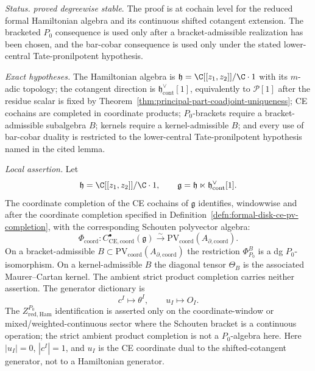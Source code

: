 \begin{stmt}\label{thm:lane-ce-pv-center}
  \emph{Status.} \emph{proved degreewise stable}.  The proof is at
  cochain level for the reduced formal Hamiltonian algebra and its
  continuous shifted cotangent extension.  The bracketed \(P_0\)
	  consequence is used only after a bracket-admissible realization has
	  been chosen, and the bar-cobar consequence is used only under the
	  stated lower-central Tate-pronilpotent hypothesis.

  \emph{Exact hypotheses.} The Hamiltonian algebra is
  \(\mathfrak h=\C[[z_1,z_2]]/\C\cdot1\) with its \(m\)-adic topology;
  the cotangent direction is
  \(\mathfrak h^\vee_{\mathrm{cont}}[1]\), equivalently to
  \(\mathcal P[1]\) after the residue scalar is fixed by
  Theorem~\ref{thm:principal-part-coadjoint-uniqueness}; CE cochains are
	  completed in coordinate products; \(P_0\)-brackets require a
	  bracket-admissible subalgebra \(B\); kernels require a
	  kernel-admissible \(B\); and every use of bar-cobar duality is
	  restricted to the lower-central Tate-pronilpotent hypothesis named in
	  the cited lemma.

  \emph{Local assertion.} Let
  \[
    \mathfrak h=\C[[z_1,z_2]]/\C\cdot1,\qquad
    \mathfrak g=\mathfrak h\ltimes
      \mathfrak h^\vee_{\mathrm{cont}}[1].
  \]
  The coordinate completion of the CE cochains of \(\mathfrak g\)
  identifies, windowwise and after the coordinate completion specified in
  Definition~\ref{defn:formal-disk-ce-pv-completion}, with
  the corresponding Schouten polyvector algebra:
  \[
    \Phi_{\mathrm{coord}}\colon
    C^\bullet_{\mathrm{CE},\mathrm{coord}}(\mathfrak g)
    \xrightarrow{\sim}
    \mathrm{PV}_{\mathrm{coord}}
    (A_{\partial,\mathrm{coord}}).
  \]
  On a bracket-admissible \(B\subset
  \mathrm{PV}_{\mathrm{coord}}(A_{\partial,\mathrm{coord}})\) the
  restriction \(\Phi^B_{P_0}\) is a dg \(P_0\)-isomorphism.  On a
  kernel-admissible \(B\) the diagonal tensor \(\Theta_B\) is the
  associated Maurer--Cartan kernel.  The ambient strict product completion
  carries neither assertion.
  The generator dictionary is
  \[
    c^I\mapsto\theta^I,\qquad u_I\mapsto O_I .
  \]
  The \(Z^{P_0}_{\mathrm{red,Ham}}\) identification is asserted only on the
  coordinate-window or mixed/weighted-continuous sector where the Schouten
  bracket is a continuous operation; the strict ambient product
  completion is not a \(P_0\)-algebra here.
  Here \(|u_I|=0\), \(|c^I|=1\), and \(u_I\) is the CE coordinate dual
  to the shifted-cotangent generator, not to a Hamiltonian generator.


\end{stmt}
